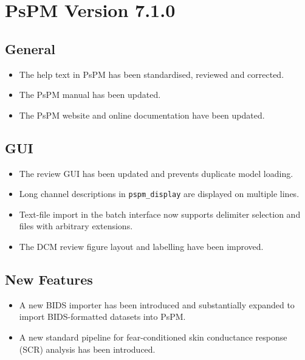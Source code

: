 \documentclass[english]{article}
\numberwithin{equation}{section}
\numberwithin{figure}{section}
\begin{document}
\section{PsPM Version 7.1.0}

\subsection*{General}
\begin{itemize}
\item The help text in PsPM has been standardised, reviewed and corrected.
\item The PsPM manual has been updated.
\item The PsPM website and online documentation have been updated.
\end{itemize}

\subsection*{GUI}
\begin{itemize}
\item The review GUI has been updated and prevents duplicate model loading.
\item Long channel descriptions in \texttt{pspm\_display} are displayed on multiple lines.
\item Text-file import in the batch interface now supports delimiter selection and files with arbitrary extensions.
\item The DCM review figure layout and labelling have been improved.
\end{itemize}

\subsection*{New Features}
\begin{itemize}
\item A new BIDS importer has been introduced and substantially expanded to import BIDS-formatted datasets into PsPM.
\item A new standard pipeline for fear-conditioned skin conductance response (SCR) analysis has been introduced.
\end{itemize}
\end{document}
